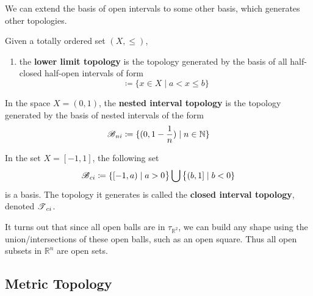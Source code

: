   We can extend the basis of open intervals to some other basis, which generates other topologies. 

  \begin{definition}
    Given a totally ordered set $(X, \leq)$, 
    \begin{enumerate}
      \item the \textbf{lower limit topology} is the topology generated by the basis of all half-closed half-open intervals of form 
      \begin{equation}
        [a, b) \coloneqq \{ x \in X \mid a \leq x < b \}
      \end{equation}
      \item the \textbf{upper limit topology} is the topology generated by the basis of all half-open half-closed intervals of form 
      \begin{equation}
        (a, b] \coloneqq \{ x \in X \mid a < x \leq b \}
      \end{equation}
    \end{enumerate}
  \end{definition}

  \begin{theorem}
    In the space $X = (0,1)$, the \textbf{nested interval topology} is the topology generated by the basis of nested intervals of the form 
    \begin{equation}
      \operatorname{\mathscr{B}}_{ni} \coloneqq \{ (0, 1-\frac{1}{n}) \mid n \in \mathbb{N} \}
    \end{equation}
  \end{theorem}

  \begin{theorem}
    In the set $X = [-1, 1]$, the following set 
    \begin{equation}
      \operatorname{\mathscr{B}}_{ci} \coloneqq \{ [-1, a) \mid a > 0 \big\} \bigcup \big\{ (b, 1] \mid b<0 \}
    \end{equation}
    is a basis. The topology it generates is called the \textbf{closed interval topology}, denoted $\operatorname{\mathscr{T}}_{ci}$. 
  \end{theorem}

  It turns out that since all open balls are in $\tau_{\mathbb{R}^{2}}$, we can build any shape using the union/intersections of these open balls, such as an open square. Thus all open subsets in $\mathbb{R}^{n}$ are open sets. 

\subsection{Metric Topology}


